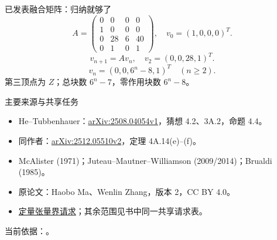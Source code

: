 \documentclass{beamer}
\begin{document}
\begin{frame}{已发表融合矩阵：归纳就够了}
\[
A=\begin{pmatrix}0&0&0&0\\1&0&0&0\\0&28&6&40\\0&1&0&1\end{pmatrix},\quad v_0=(1,0,0,0)^T.
\]
\[
v_{n+1}=Av_n,\quad v_2=(0,0,28,1)^T.
\]
\[
v_n=(0,0,6^n-8,1)^T\quad(n\geq2).
\]
第三顶点为 $Z$；总块数 $6^n-7$，零作用块数 $6^n-8$。
\end{frame}
\begin{frame}{主要来源与共享任务}
\footnotesize
\begin{itemize}
\item He--Tubbenhauer：\href{https://arxiv.org/abs/2508.04054v1}{arXiv:2508.04054v1}，猜想 4.2、3A.2，命题 4.4。
\item 同作者：\href{https://arxiv.org/abs/2512.05510v2}{arXiv:2512.05510v2}，定理 4A.14(e)--(f)。
\item McAlister (1971)；Juteau--Mautner--Williamson (2009/2014)；Brualdi (1985)。
\item 原论文：Haobo Ma、Wenlin Zhang，版本 2，CC BY 4.0。
\item \href{https://github.com/the-omega-institute/trureturing-requests/issues/45}{定量张量界请求}；其余范围见书中同一共享请求表。
\end{itemize}
当前依据：\PinnedCommit。
\end{frame}
\FormalVerification
\end{document}
